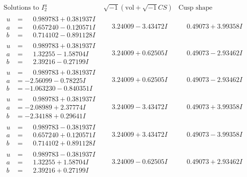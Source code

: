 \documentclass[1p]{elsarticle_modified}
\theoremstyle{definition}
\newcommand{\I}{\sqrt{-1}}
\begin{document}
$$\begin{array}{c|c|c}  
\text{Solutions to }I^u_{2}& \I (\text{vol} + \sqrt{-1}CS) & \text{Cusp shape}\\
 \hline 
\begin{aligned}
u &= \phantom{-}0.989783 + 0.381937 I \\
a &= \phantom{-}0.657240 - 0.120571 I \\
b &= \phantom{-}0.714102 - 0.891128 I\end{aligned}
 & \phantom{-}3.24009 - 3.43472 I & \phantom{-}0.49073 + 3.99358 I \\ \hline\begin{aligned}
u &= \phantom{-}0.989783 + 0.381937 I \\
a &= \phantom{-}1.32255 - 1.58704 I \\
b &= \phantom{-}2.39216 - 0.27199 I\end{aligned}
 & \phantom{-}3.24009 + 0.62505 I & \phantom{-}0.49073 - 2.93462 I \\ \hline\begin{aligned}
u &= \phantom{-}0.989783 + 0.381937 I \\
a &= -2.56099 - 0.78225 I \\
b &= -1.063230 - 0.840351 I\end{aligned}
 & \phantom{-}3.24009 + 0.62505 I & \phantom{-}0.49073 - 2.93462 I \\ \hline\begin{aligned}
u &= \phantom{-}0.989783 + 0.381937 I \\
a &= -2.08989 + 2.37774 I \\
b &= -2.34188 + 0.29641 I\end{aligned}
 & \phantom{-}3.24009 - 3.43472 I & \phantom{-}0.49073 + 3.99358 I \\ \hline\begin{aligned}
u &= \phantom{-}0.989783 - 0.381937 I \\
a &= \phantom{-}0.657240 + 0.120571 I \\
b &= \phantom{-}0.714102 + 0.891128 I\end{aligned}
 & \phantom{-}3.24009 + 3.43472 I & \phantom{-}0.49073 - 3.99358 I \\ \hline\begin{aligned}
u &= \phantom{-}0.989783 - 0.381937 I \\
a &= \phantom{-}1.32255 + 1.58704 I \\
b &= \phantom{-}2.39216 + 0.27199 I\end{aligned}
 & \phantom{-}3.24009 - 0.62505 I & \phantom{-}0.49073 + 2.93462 I \\ \hline\begin{aligned}

\end{aligned}
\end{array}$$
\end{document}
